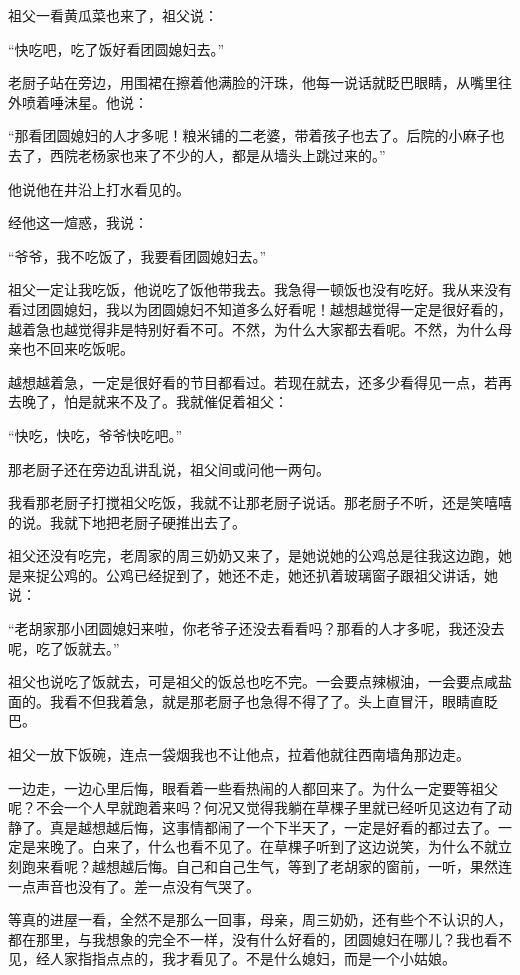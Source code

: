 \par 祖父一看黄瓜菜也来了，祖父说：
\par “快吃吧，吃了饭好看团圆媳妇去。”
\par 老厨子站在旁边，用围裙在擦着他满脸的汗珠，他每一说话就眨巴眼睛，从嘴里往外喷着唾沫星。他说：
\par “那看团圆媳妇的人才多呢！粮米铺的二老婆，带着孩子也去了。后院的小麻子也去了，西院老杨家也来了不少的人，都是从墙头上跳过来的。”
\par 他说他在井沿上打水看见的。
\par 经他这一煊惑，我说：
\par “爷爷，我不吃饭了，我要看团圆媳妇去。”
\par 祖父一定让我吃饭，他说吃了饭他带我去。我急得一顿饭也没有吃好。我从来没有看过团圆媳妇，我以为团圆媳妇不知道多么好看呢！越想越觉得一定是很好看的，越着急也越觉得非是特别好看不可。不然，为什么大家都去看呢。不然，为什么母亲也不回来吃饭呢。
\par 越想越着急，一定是很好看的节目都看过。若现在就去，还多少看得见一点，若再去晚了，怕是就来不及了。我就催促着祖父：
\par “快吃，快吃，爷爷快吃吧。”
\par 那老厨子还在旁边乱讲乱说，祖父间或问他一两句。
\par 我看那老厨子打搅祖父吃饭，我就不让那老厨子说话。那老厨子不听，还是笑嘻嘻的说。我就下地把老厨子硬推出去了。
\par 祖父还没有吃完，老周家的周三奶奶又来了，是她说她的公鸡总是往我这边跑，她是来捉公鸡的。公鸡已经捉到了，她还不走，她还扒着玻璃窗子跟祖父讲话，她说：
\par “老胡家那小团圆媳妇来啦，你老爷子还没去看看吗？那看的人才多呢，我还没去呢，吃了饭就去。”
\par 祖父也说吃了饭就去，可是祖父的饭总也吃不完。一会要点辣椒油，一会要点咸盐面的。我看不但我着急，就是那老厨子也急得不得了了。头上直冒汗，眼睛直眨巴。
\par 祖父一放下饭碗，连点一袋烟我也不让他点，拉着他就往西南墙角那边走。
\par 一边走，一边心里后悔，眼看着一些看热闹的人都回来了。为什么一定要等祖父呢？不会一个人早就跑着来吗？何况又觉得我躺在草棵子里就已经听见这边有了动静了。真是越想越后悔，这事情都闹了一个下半天了，一定是好看的都过去了。一定是来晚了。白来了，什么也看不见了。在草棵子听到了这边说笑，为什么不就立刻跑来看呢？越想越后悔。自己和自己生气，等到了老胡家的窗前，一听，果然连一点声音也没有了。差一点没有气哭了。
\par 等真的进屋一看，全然不是那么一回事，母亲，周三奶奶，还有些个不认识的人，都在那里，与我想象的完全不一样，没有什么好看的，团圆媳妇在哪儿？我也看不见，经人家指指点点的，我才看见了。不是什么媳妇，而是一个小姑娘。
